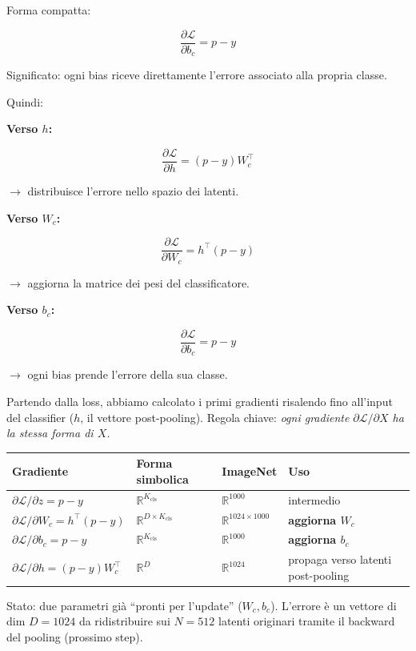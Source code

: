 \documentclass[
  11pt,
]{article}
\begin{document}
Forma compatta:


\[\frac{\partial\mathcal{L}}{\partial b_{c}} = p - y\]

Significato: ogni bias riceve direttamente l'errore
associato alla propria classe.


Quindi:

\textbf{Verso $h$:}

\[\frac{\partial\mathcal{L}}{\partial h} = (p - y)W_{c}^{\top}\]

$\rightarrow$ distribuisce l'errore nello spazio dei
latenti.

\textbf{Verso $W_c$:}

\[\frac{\partial\mathcal{L}}{\partial W_{c}} = h^{\top}(p - y)\]

$\rightarrow$ aggiorna la matrice dei pesi del classificatore.

\textbf{Verso $b_c$:}

\[\frac{\partial\mathcal{L}}{\partial b_{c}} = p - y\]

\(\rightarrow\) ogni bias prende l'errore della sua
classe.

\begin{notabox}[title={\textbf{Checkpoint gradienti --- fine Loss + Softmax + Classifier}}]
Partendo dalla loss, abbiamo calcolato i primi gradienti risalendo fino all'input del classifier ($h$, il vettore post-pooling). Regola chiave: \emph{ogni gradiente $\partial\mathcal{L}/\partial X$ ha la stessa forma di $X$.}

\medskip
\begin{center}
\begin{tabular}{@{}llll@{}}
\toprule
\textbf{Gradiente} & \textbf{Forma simbolica} & \textbf{ImageNet} & \textbf{Uso} \\
\midrule
$\partial\mathcal{L}/\partial z = p - y$ & $\mathbb{R}^{K_{\text{cls}}}$ & $\mathbb{R}^{1000}$ & intermedio \\
$\partial\mathcal{L}/\partial W_c = h^\top (p - y)$ & $\mathbb{R}^{D \times K_{\text{cls}}}$ & $\mathbb{R}^{1024 \times 1000}$ & \textbf{aggiorna $W_c$} \\
$\partial\mathcal{L}/\partial b_c = p - y$ & $\mathbb{R}^{K_{\text{cls}}}$ & $\mathbb{R}^{1000}$ & \textbf{aggiorna $b_c$} \\
$\partial\mathcal{L}/\partial h = (p-y) W_c^\top$ & $\mathbb{R}^{D}$ & $\mathbb{R}^{1024}$ & propaga verso latenti post-pooling \\
\bottomrule
\end{tabular}
\end{center}

\medskip
Stato: due parametri già ``pronti per l'update'' ($W_c, b_c$). L'errore è un vettore di dim $D=1024$ da ridistribuire sui $N=512$ latenti originari tramite il backward del pooling (prossimo step).
\end{notabox}
\end{document}
